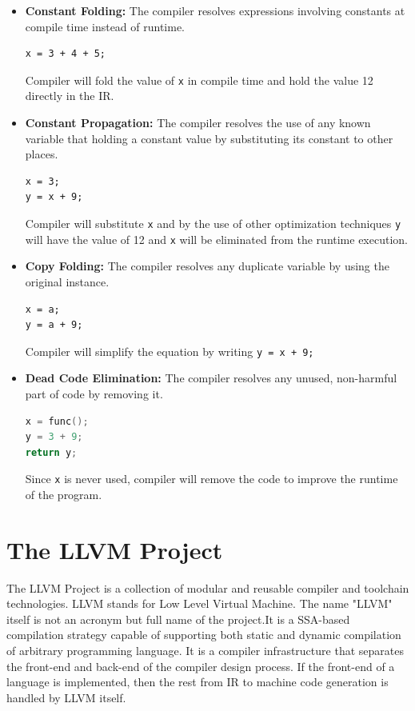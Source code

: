 \documentclass[acmlarge, nonacm]{acmart}
\begin{document}
\begin{itemize}
\item{\textbf{Constant Folding:}} The compiler resolves expressions involving constants at compile time instead of runtime.
\begin{lstlisting}
x = 3 + 4 + 5;
\end{lstlisting}
Compiler will fold the value of \verb|x| in compile time and hold the value 12 directly in the IR.

\item{\textbf{Constant Propagation:}} The compiler resolves the use of any known variable that holding a constant value by substituting its constant to other places.
\begin{lstlisting}
x = 3;
y = x + 9;
\end{lstlisting}
Compiler will substitute \verb|x| and by the use of other optimization techniques \verb|y| will have the value of 12 and \verb|x| will be eliminated from the runtime execution.

\item{\textbf{Copy Folding:}} The compiler resolves any duplicate variable by using the original instance.
\begin{lstlisting}
x = a;
y = a + 9;
\end{lstlisting}
Compiler will simplify the equation by writing \verb|y = x + 9;| 

\item{\textbf{Dead Code Elimination:}} The compiler resolves any unused, non-harmful part of code by removing it.
\begin{lstlisting}[language=C++]
x = func();
y = 3 + 9;
return y;
\end{lstlisting}
Since \verb|x| is never used, compiler will remove the code to improve the runtime of the program.
\end{itemize}



\section{The LLVM Project}
The LLVM Project is a collection of modular and reusable compiler and toolchain technologies. LLVM stands for Low Level Virtual Machine. The name "LLVM" itself is not an acronym but full name of the project.It is a SSA-based compilation strategy capable of supporting both static and dynamic compilation of arbitrary programming language. It is a compiler infrastructure that separates the front-end and back-end of the compiler design process. If the front-end of a language is implemented, then the rest from IR to machine code generation is handled by LLVM itself. \cite{llvm}
\end{document}
